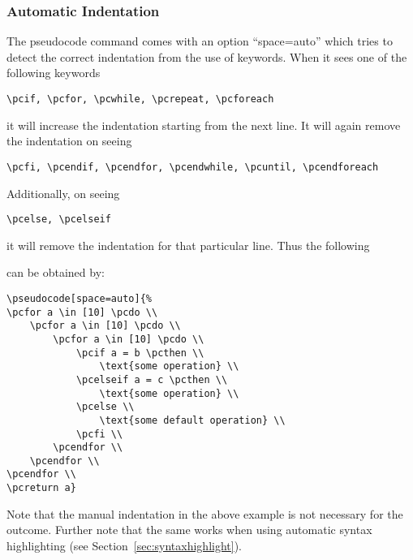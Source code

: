\documentclass[a4paper]{report}
\begin{document}
\subsubsection{Automatic Indentation}
The pseudocode command comes with an option \enquote{space=auto} which tries to detect the correct indentation from the use of
keywords. When it sees one of the following keywords
\begin{lstlisting}
\pcif, \pcfor, \pcwhile, \pcrepeat, \pcforeach
\end{lstlisting}
it will increase the indentation starting from the next line. It will again remove the indentation on seeing 
\begin{lstlisting}
\pcfi, \pcendif, \pcendfor, \pcendwhile, \pcuntil, \pcendforeach
\end{lstlisting}
Additionally, on seeing
\begin{lstlisting}
\pcelse, \pcelseif
\end{lstlisting}
it will remove the indentation for that particular line. Thus the following 
\begin{center}
\end{center}
can be obtained by:
\begin{lstlisting}
\pseudocode[space=auto]{%
\pcfor a \in [10] \pcdo \\
	\pcfor a \in [10] \pcdo \\
		\pcfor a \in [10] \pcdo \\
			\pcif a = b \pcthen \\
				\text{some operation} \\
			\pcelseif a = c \pcthen \\
				\text{some operation} \\
			\pcelse \\
				\text{some default operation} \\
			\pcfi \\
		\pcendfor \\
	\pcendfor \\
\pcendfor \\
\pcreturn a}
\end{lstlisting}
Note that the manual indentation in the above example is not necessary for the outcome. Further note that the same
works when using automatic syntax highlighting (see Section~\ref{sec:syntaxhighlight}).
\end{document}
